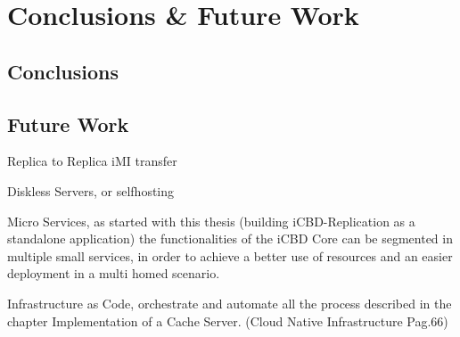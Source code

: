 \chapter{Conclusions \& Future Work}
\label{cha:conclusion}

\section{Conclusions}
\label{sec:conclusions}

\section{Future Work}
\label{sec:future_work}

Replica to Replica iMI transfer

Diskless Servers, or selfhosting 

Micro Services, as started with this thesis (building iCBD-Replication as a standalone application) the functionalities of the iCBD Core can be segmented in multiple small services, in order to achieve a better use of resources and an easier deployment in a multi homed scenario.

Infrastructure as Code, orchestrate and automate all the process described in the chapter Implementation of a Cache Server. (Cloud Native Infrastructure Pag.66)

